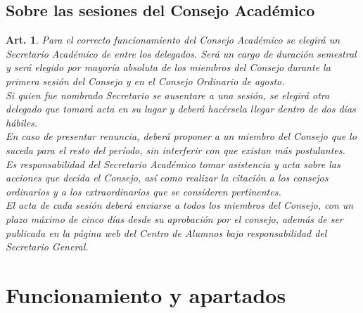 \documentclass[letterpaper,11pt]{article}
\theoremstyle{plain}
\newtheorem{art}{Art.} %
\begin{document}
		\subsection*{Sobre las sesiones del Consejo Académico}


			\begin{art}
				Para el correcto funcionamiento del Consejo Académico se elegirá un Secretario Académico de entre los delegados. Será un cargo de duración semestral y será elegido por mayoría absoluta de los miembros del Consejo durante la primera sesión del Consejo  y en el Consejo Ordinario de agosto.
				\\
				Si quien fue nombrado Secretario se ausentare a una sesión, se elegirá otro delegado que tomará acta en su lugar y deberá hacérsela llegar dentro de dos días hábiles.
				\\
				En caso de presentar renuncia, deberá proponer a un miembro del Consejo que lo suceda para el resto del período, sin interferir con que existan más postulantes.
				\\
				Es responsabilidad del Secretario Académico tomar asistencia y acta sobre las acciones que decida el Consejo, así como realizar la citación a los consejos ordinarios y a los extraordinarios que se consideren pertinentes.
				\\
				El acta de cada sesión deberá enviarse a todos los miembros del Consejo, con un plazo máximo de cinco días  desde su aprobación por el consejo, además de ser publicada en la página web del Centro de Alumnos bajo responsabilidad del Secretario General.
			\end{art}

	\section{Funcionamiento y apartados}
\end{document}
